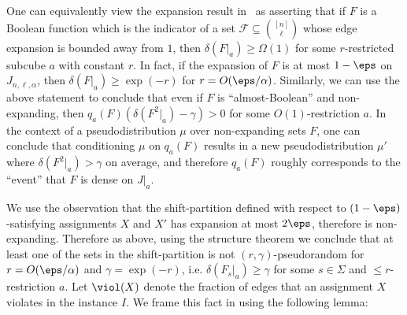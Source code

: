 One can equivalently view the expansion result in~\cite{KMMS} as asserting that if $F$ is a Boolean function which is the
indicator of a set $\mathcal{F}\subseteq \binom{[n]}{\ell}$ whose edge 
expansion is bounded away from $1$, then $\delta(F|_{a})\geq \Omega(1)$ for 
some $r$-restricted subcube $a$ with constant $r$. In fact, if the expansion of $F$ is at most $1-\eps$ on $J_{n,\ell,\alpha}$, then $\delta(F|_a) \geq \exp(-r)$ for $r = O(\eps/\alpha)$. Similarly, we can use the above \sos statement to conclude that even if $F$ is ``almost-Boolean'' and non-expanding, then $q_a(F)(\delta(F^2|_a) - \gamma) > 0$ for some $O(1)$-restriction $a$. In the context of a pseudodistribution $\mu$ over non-expanding sets $F$, one can conclude that conditioning $\mu$ on $q_a(F)$ results in a new pseudodistribution $\mu'$ where $\delta(F^2|_a) > \gamma$ on average, and therefore $q_a(F)$ roughly corresponds to the ``event'' that $F$ is dense on $J|_a$.

We use the observation that the shift-partition defined with respect to $(1-\eps)$-satisfying assignments $X$ and $X'$ has expansion at most $2\eps$, therefore is non-expanding. Therefore as above, using the structure theorem we conclude that at least one of the sets in the shift-partition is not $(r,\gamma)$-pseudorandom for $r = O(\eps/\alpha)$ and $\gamma = \exp(-r)$, i.e. $\delta(F_s|_a) \geq \gamma$ for some $s \in \Sigma$ and $\leq r$-restriction $a$. Let $\viol(X)$ denote the fraction of edges that an assignment $X$ violates in the instance $I$. We frame this fact in \sos using the following lemma:

